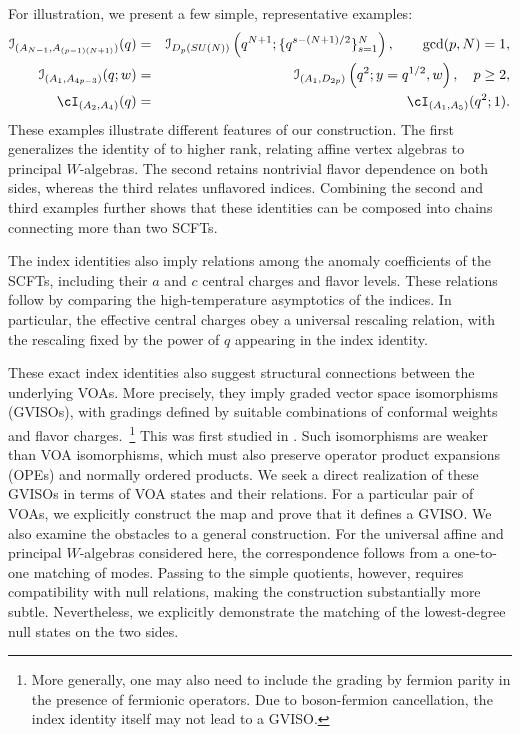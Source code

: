 \documentclass[a4paper,11pt]{article}
\theoremstyle{definition}
\theoremstyle{definition}
\theoremstyle{remark}
\newcommand{\beqn}{\begin{eqnarray}}
\newcommand{\eeqn}{\end{eqnarray}}
\begin{document}
For illustration, we present a few simple, representative examples:
\beqn\nonumber
\mathcal I_{(A_{N-1},A_{(p-1)(N+1)})}(q)
&=&
\mathcal I_{D_p(SU(N))}
\left(q^{N+1};\{q^{s-(N+1)/2}\}_{s=1}^N\right),
\qquad \gcd(p,N)=1,
\\ \nonumber
\mathcal I_{(A_1,A_{4p-3})}(q;w)
&=&
\mathcal I_{(A_1,D_{2p})}
\left(q^2;y=q^{1/2},w\right),
\quad p\ge2,
\\ \nonumber
\cI_{(A_2,A_4)}(q)
&=&
\cI_{(A_1,A_5)}(q^2;1).
\eeqn
These examples illustrate different features of our construction. The first generalizes the identity of \cite{Adamovic:2025efe} to higher rank, relating affine vertex algebras to principal $W$-algebras. The second retains nontrivial flavor dependence on both sides, whereas the third relates unflavored indices. Combining the second and third examples further shows that these identities can be composed into chains connecting more than two SCFTs.

The index identities also imply relations among the anomaly coefficients of the SCFTs, including their $a$ and $c$ central charges and flavor levels. These relations follow by comparing the high-temperature asymptotics of the indices. In particular, the effective central charges obey a universal rescaling relation, with the rescaling fixed by the power of $q$ appearing in the index identity.

These exact index identities also suggest structural connections between the underlying VOAs. More precisely, they imply graded vector space isomorphisms (GVISOs),   with gradings defined by suitable combinations of conformal weights and flavor charges.~\footnote{More generally, one may also need to include the grading by fermion parity in the presence of fermionic operators.
Due to boson-fermion cancellation, the index identity itself may not lead to a GVISO. 
 }
This was first studied in \cite{Buican:2020moo}. Such isomorphisms are weaker than VOA isomorphisms, which must also preserve operator product expansions (OPEs) and normally ordered products. We seek a direct realization of these GVISOs in terms of VOA states and their relations. For a particular pair of VOAs, we explicitly construct the map and prove that it defines a GVISO. We also examine the obstacles to a general construction. For the universal affine and principal $W$-algebras considered here, the correspondence follows from a one-to-one matching of modes. Passing to the simple quotients, however, requires compatibility with null relations, making the construction substantially more subtle. Nevertheless, we explicitly demonstrate the matching of the lowest-degree null states on the two sides.
\end{document}
